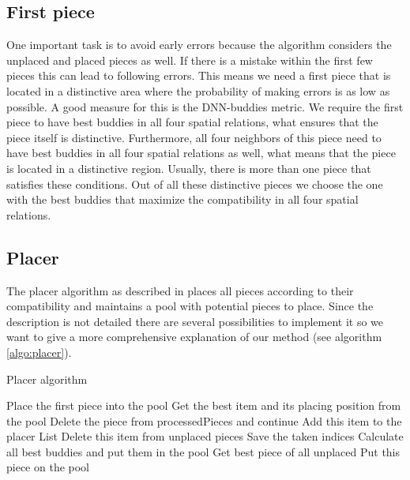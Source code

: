 \documentclass[11pt]{report}
\begin{document}
\subsection{First piece}
One important task is to avoid early errors because the algorithm considers the unplaced and placed pieces as well. If there is a mistake within the first few pieces this can lead to following errors.
This means we need a first piece that is located in a distinctive area where the probability of making errors is as low as possible. A good measure for this is the DNN-buddies metric. We require the first piece to have best buddies in all four spatial relations, what ensures that the piece itself is distinctive. Furthermore, all four neighbors of this piece need to have best buddies in all four spatial relations as well, what means that the piece is located in a distinctive region. 
Usually, there is more than one piece that satisfies these conditions. Out of all these distinctive pieces we choose the one with the best buddies that maximize the compatibility in all four spatial relations.

\subsection{Placer}
The placer algorithm as described in \cite{Paikin2015} places all pieces according to their compatibility and maintains a pool with potential pieces to place. Since the description is not detailed there are several possibilities to implement it so we want to give a more comprehensive explanation of our method (see algorithm \ref{algo:placer}).

\begin{algorithm}
	\caption{Placer algorithm}
	\label{algo:placer}
	\begin{algorithmic}
		\State Place the first piece into the pool
		\State Get the best item and its placing position from the pool
		\State Delete the piece from processedPieces and continue \EndIf
		\State Add this item to the placer List
		\State Delete this item from unplaced pieces
		\State Save the taken indices
		\State Calculate all best buddies and put them in the pool
		\EndWhile
		\State Get best piece of all unplaced
		\State Put this piece on the pool
		\EndIf
		\EndWhile
	\end{algorithmic}
\end{algorithm}
\end{document}
